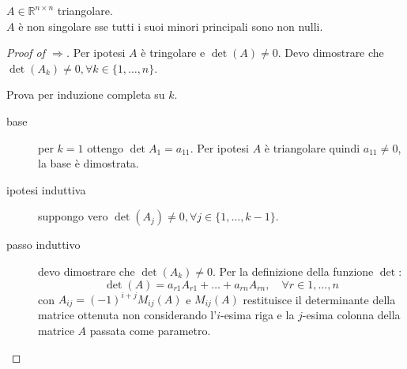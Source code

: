 \begin{exercise}[3.5, Lemma 3.2]
$A \in \mathbb{R}^{n \times n}$ triangolare. \\
$A$ \`e non singolare sse tutti i suoi
minori principali sono non nulli. 
\end{exercise}
\begin{proof}[Proof of $\Rightarrow$]
Per ipotesi $A$ \`e tringolare e $\det(A) \not = 0$.
Devo dimostrare che $\det(A_{k}) \not = 0, \forall k \in \lbrace 1,\ldots, n
\rbrace$.

Prova per induzione completa su $k$.
\begin{description}
\item[base] per $k = 1$ ottengo $\det{A_{1}} = a_{11}$. Per ipotesi $A$ \`e
triangolare quindi $a_{11} \not = 0$, la base \`e dimostrata.
\item[ipotesi induttiva] suppongo vero $\det(A_{j}) \not = 0, \forall j \in
\lbrace 1,\ldots, k-1 \rbrace$.
\item[passo induttivo] devo dimostrare che $\det(A_{k}) \not = 0$.
Per la definizione della funzione $\det$:
\begin{displaymath}
\det(A) = a_{r1}A_{r1} + \ldots + a_{rn}A_{rn}, \quad \forall r \in {1,\ldots,n}
\end{displaymath}
con $A_{ij} = (-1)^{i+j}M_{ij}(A)$ e $M_{ij}(A)$ restituisce il determinante
della matrice ottenuta non considerando l'$i$-esima riga e la $j$-esima colonna
della matrice $A$ passata come parametro.
\end{description}


\end{proof}
